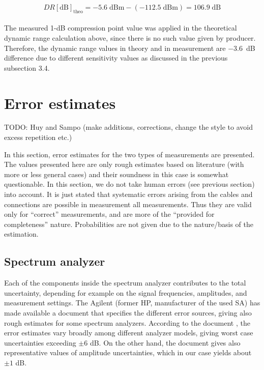 \documentclass[a4paper, 12pt]{article}
\begin{document}
\begin{equation}
DR[\mathrm{dB}]_\mathrm{theo} = -5.6 \mathrm{\;dBm} - (-112.5 \mathrm{\;dBm}) = 106.9 \mathrm{\;dB}
\end{equation}
\\

The measured 1-dB compression point value was applied in the theoretical dynamic range calculation above, since there is no such value given by producer. Therefore, the dynamic range values in theory and in measurement are $-3.6$~dB difference due to different sensitivity values as discussed in the previous subsection 3.4.


\newpage
\section{Error estimates}

TODO: Huy and Sampo (make additions, corrections, change the style to avoid excess 
repetition etc.)

In this section, error estimates for the two types of measurements are presented.
The values presented here are only rough estimates based on literature (with more 
or less general cases) and their soundness in this case is somewhat questionable. 
In this section, we do not take human errors (see previous section) into account. 
It is just stated that systematic errors arising from the cables and connections 
are possible in measurement all measurements. Thus they are valid only for 
``correct'' measurements, and are more of the ``provided for completeness'' 
nature. Probabilities are not given due to the nature/basis of the estimation.


\subsection{Spectrum analyzer}

Each of the components inside the spectrum analyzer contributes to the total uncertainty, 
depending for example on the signal frequencies, amplitudes, and measurement settings. 
The Agilent (former HP, manufacturer of the used SA) has made available a document that 
specifies the different error sources, giving also rough estimates for some spectrum 
analyzers. According to the document \cite{sa}, the error estimates vary broadly among 
different analyzer models, giving worst case uncertainties exceeding $\pm 6$ dB. On the 
other hand, the document gives also representative values of amplitude uncertainties, 
which in our case yields about $\pm 1$ dB.
\end{document}
